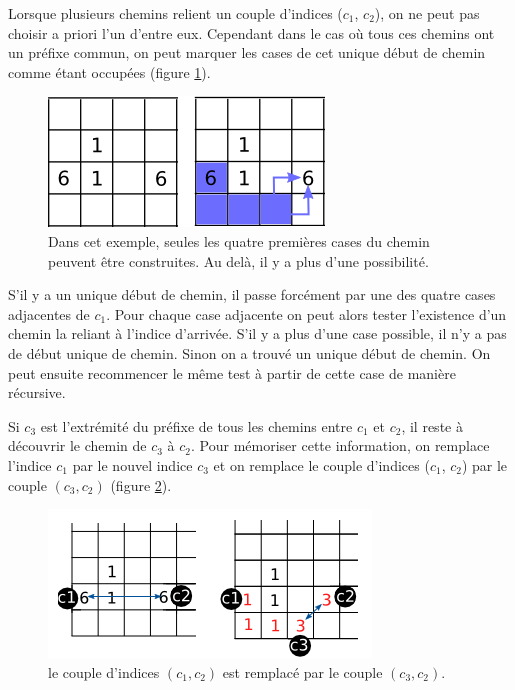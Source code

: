 Lorsque plusieurs chemins relient un couple d'indices ($c_1$, $c_2$), on ne peut pas choisir a priori l'un d'entre eux. Cependant dans le cas où tous ces chemins ont un préfixe commun, on peut marquer les cases de cet unique début de chemin comme étant occupées (figure \ref{progression-chemin}).

\begin{figure}[h]
  \centering  
\includegraphics[scale=0.5]{construire}
\caption{Dans cet exemple, seules les quatre premières cases du chemin peuvent être construites. Au delà, il y a plus d'une possibilité.}
\label{progression-chemin}
\end{figure}

S'il y a un unique début de chemin, il passe forcément par une des quatre cases adjacentes de $c_1$. Pour chaque case adjacente on peut alors tester l'existence d'un chemin la reliant à l'indice d'arrivée. S'il y a plus d'une case possible, il n'y a pas de début unique de chemin. Sinon on a trouvé un unique début de chemin. On peut ensuite recommencer le même test à partir de cette case de manière récursive. 


Si $c_3$ est l'extrémité du préfixe de tous les chemins entre $c_1$ et $c_2$, il reste à découvrir le chemin de $c_3$ à $c_2$. Pour mémoriser cette information, on remplace l'indice $c_1$ par le nouvel indice $c_3$ et on remplace le couple d'indices
($c_1$, $c_2$) par le couple $(c_3, c_2)$ (figure \ref{remplacement-couple}).

\begin{figure}[h]
  \centering  
\includegraphics[scale=0.5]{remplacement}
\caption{le couple
d’indices $(c_1, c_2)$ est remplacé par le couple $(c_3, c_2)$.}
\label{remplacement-couple}
\end{figure}

